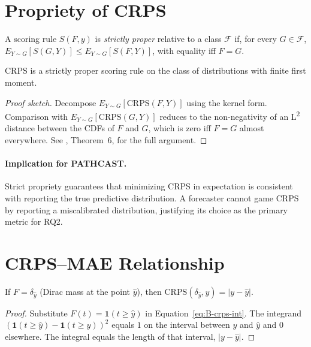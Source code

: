 \section{Propriety of CRPS}
\label{app:B-crps-proper}

\begin{definition}
A scoring rule $S(F, y)$ is \emph{strictly proper} relative to a class
$\mathcal{F}$ if, for every $G \in \mathcal{F}$,
$E_{Y \sim G}[S(G, Y)] \leq E_{Y \sim G}[S(F, Y)]$, with equality iff
$F = G$.
\end{definition}

\begin{theorem}
\label{thm:H-proper}
CRPS is a strictly proper scoring rule on the class of distributions with
finite first moment.
\end{theorem}

\begin{proof}[Proof sketch]
Decompose $E_{Y \sim G}[\mathrm{CRPS}(F, Y)]$ using the kernel form.
Comparison with $E_{Y \sim G}[\mathrm{CRPS}(G, Y)]$ reduces to the
non-negativity of an L\textsuperscript{2} distance between the CDFs of $F$
and $G$, which is zero iff $F = G$ almost everywhere. See
\cite{gneiting2007strictly}, Theorem~6, for the full argument.
\end{proof}

\paragraph{Implication for PATHCAST.} Strict propriety guarantees that
minimizing CRPS in expectation is consistent with reporting the true
predictive distribution. A forecaster cannot game CRPS by reporting a
miscalibrated distribution, justifying its choice as the primary metric
for RQ2.


\section{CRPS--MAE Relationship}
\label{app:B-crps-mae}

\begin{theorem}
\label{thm:H-mae}
If $F = \delta_{\hat{y}}$ (Dirac mass at the point $\hat{y}$), then
$\mathrm{CRPS}(\delta_{\hat{y}}, y) = |y - \hat{y}|$.
\end{theorem}

\begin{proof}
Substitute $F(t) = \mathbf{1}(t \geq \hat{y})$ in
Equation~\ref{eq:B-crps-int}. The integrand
$(\mathbf{1}(t \geq \hat{y}) - \mathbf{1}(t \geq y))^2$ equals $1$ on the
interval between $y$ and $\hat{y}$ and $0$ elsewhere. The integral equals
the length of that interval, $|y - \hat{y}|$.
\end{proof}

